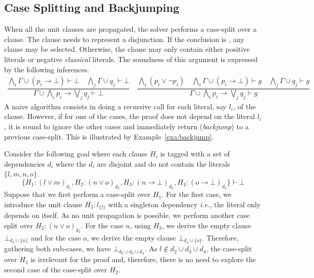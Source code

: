 \documentclass[utf8,a4paper,UKenglish,cleveref, autoref, thm-restate]{lipics-v2021}
\begin{document}
\subsection{Case Splitting and Backjumping}
\label{sec:case-split}

When all the unit clauses are propagated, the solver performs a
case-split over a clause. The clause needs to represent a
disjunction. If the conclusion is , any clause may be
selected. Otherwise, the clause may only contain  either positive literals or  negative
\emph{classical} literals. The soundness of this argument is expressed by
the following  inferences.
\[
  \begin{array}{l}
    \dfrac{
    \bigwedge_i \Gamma \cup (p_i \to \bot) \vdash \bot \quad \bigwedge_j \Gamma \cup q_j  \vdash \bot
    }
    {\Gamma \cup \bigwedge_i p_i \to \bigvee_j q_j \vdash \bot} \quad
    \dfrac{
    \bigwedge_i (p_i \lor \neg p_i) \quad
    \bigwedge_i \Gamma \cup (p_i \to \bot) \vdash g \quad \bigwedge_j \Gamma \cup q_j  \vdash g
    }
    {\Gamma \cup \bigwedge_i p_i \to \bigvee_j q_j \vdash g} \quad
  \end{array}
\]
A naive algorithm consists in doing a recursive call for each literal,
say $l_i$, of the clause.  However, if for one of the cases, the proof
does not depend on the literal $l_i$, it is sound to ignore the other
cases and immediately return (\emph{backjump}) to a previous
case-split. This is illustrated by Example~\ref{exa:backjump}.
\begin{example}[Backjumping]
  \label{exa:backjump}
  Consider the following goal where each clause $H_i$ is tagged with a
  set of dependencies $d_i$ where the $d_i$ are disjoint and do not
  contain the literals $\{l,m,n,o\}$.
  \[
    \{
    H_1 : (l \lor m)_{d_1}, 
    H_2 : (n \lor o)_{d_2},
    H_3 : (n \to \bot)_{d_3},
    H_4 : (o \to \bot)_{d_4}
    \}\vdash \bot
\]
Suppose that we first perform a case-split over $H_1$.  For the first
case, we introduce the unit clause $H_5:l_{\{l\}}$ with a singleton
dependency \emph{i.e.}, the literal only depends on itself. As no unit
propagation is possible, we perform another case split over $H_2: (n \lor o)_{d_2}$.
For the case $n$, using $H_3$, we derive the empty clause
$\bot_{d_3 \cup \{n\}}$ and for the case $o$, we derive the empty
clause $\bot_{d_4 \cup \{o\}}$. Therefore, gathering both sub-cases,
we have $\bot_{d_2 \cup d_3 \cup d_4}$.  As
$l \notin d_2 \cup d_3 \cup d_4$, the case-split over $H_1$ is
irrelevant for the proof and, therefore, there is no need to explore
the second case of the case-split over $H_2$.
\end{example}
\end{document}
